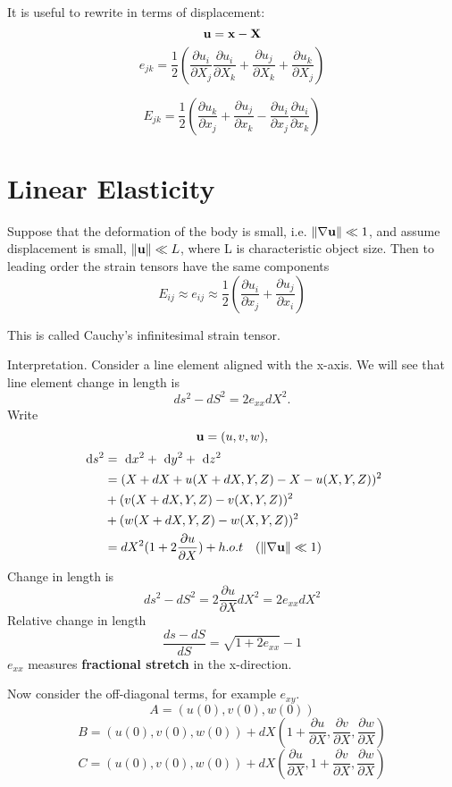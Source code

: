 \documentclass[12pt]{article}
\newcommand{\xx}{{\bf x}}
\newcommand{\uu}{{\bf u}}
\newcommand{\bX}{{\bf X}}
\newcommand{\bnabla}{{\bf \nabla}}
\newcommand{\dx}[1]{\text{ d}#1}
\begin{document}
It is useful to rewrite in terms of displacement:
\[
\uu = \xx - \bX
\]
\[
e_{jk} = \frac 1 2 ( \frac{\partial u_i}{\partial X_j} \frac{\partial u_i}{\partial X_k} +  \frac{\partial u_j}{\partial X_k}  +\frac{\partial u_k}{\partial X_j}  )
\]

\[
E_{jk} = \frac 1 2 ( \frac{\partial u_k}{\partial x_j}  +  \frac{\partial u_j}{\partial x_k}  - \frac{\partial u_i}{\partial x_j} \frac{\partial u_i}{\partial x_k}      )
\]


\section{Linear Elasticity}
Suppose that the deformation of the body is small, i.e. $\|\bnabla \uu\| \ll 1$, and assume displacement is small, $\| \uu\|\ll L$, where L is characteristic object size. Then to leading order the strain tensors have the same components
\[
E_{ij} \approx e_{ij} \approx \frac 1 2 (\frac{\partial u_i}{\partial x_j} + \frac{\partial u_j}{\partial x_i})
\]

This is called Cauchy's infinitesimal strain tensor.

Interpretation. Consider a line element aligned with the x-axis. We will see that line element change in length is 
\[
ds^2 - dS^2 = 2 e_{xx}dX^2.
\]
Write
\[
\uu = (u, v, w),
\]
\begin{align*}
\dx{s^2} &= \dx{x^2} + \dx{y^2} + \dx{z^2} \\
 &= (X + dX + u(X+dX, Y, Z) - X- u(X,Y,Z))^2  \\
 &+   (v(X+dX,Y , Z)  - v(X,Y,Z))^2 \\
 &+  ( w(X+dX, Y, Z) - w(X,Y,Z))^2\\
 &= dX^2 (1+2\frac{\partial u}{\partial X} ) + h.o.t \quad (\|\nabla \uu \|\ll 1)
\end{align*}
Change in length is
\[
ds^2 - dS^2 = 2 \frac{\partial u}{\partial X} dX^2 = 2 e_{xx} dX^2
\]
Relative change in length
\[
\frac{ds-dS}{dS} = \sqrt{1+2e_{xx}}  -1
\]
$e_{xx}$ measures {\bf fractional stretch} in the x-direction.

Now consider the off-diagonal terms, for example $e_{xy}$.
\[
A = (u(0), v(0),w(0))
\]
\[
B = (u(0), v(0),w(0)) + dX(1+ \frac{\partial u}{\partial X},  \frac{\partial v}{\partial X},  \frac{\partial w}{\partial X})
\]
\[
C = (u(0), v(0),w(0))+ dX( \frac{\partial u}{\partial X},  1+\frac{\partial v}{\partial X},  \frac{\partial w}{\partial X})
\]
\end{document}
